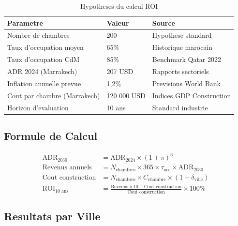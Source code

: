 \documentclass[12pt,a4paper]{report}
\begin{document}
\begin{itemize}[leftmargin=1.5em]
\begin{table}[H]
\centering\small\renewcommand{\arraystretch}{1.4}
\begin{tabular}{p{5cm}p{3cm}p{5cm}}
\toprule
\textbf{Parametre} & \textbf{Valeur} & \textbf{Source} \\
\midrule
Nombre de chambres & 200 & Hypothese standard \\
Taux d'occupation moyen & 65\% & Historique marocain \\
Taux d'occupation CdM & 85\% & Benchmark Qatar 2022 \\
ADR 2024 (Marrakech) & 207 USD & Rapports sectoriels \\
Inflation annuelle prevue & 1,2\% & Previsions World Bank \\
Cout par chambre (Marrakech) & 120 000 USD & Indices GDP Construction \\
Horizon d'evaluation & 10 ans & Standard industrie \\
\bottomrule
\end{tabular}
\caption{Hypotheses du calcul ROI}
\end{table}

\subsection{Formule de Calcul}

\begin{align*}
\text{ADR}_{2030}           &= \text{ADR}_{2024} \times (1 + \pi)^6 \\[0.5em]
\text{Revenus annuels}      &= N_{\text{chambres}} \times 365
  \times \tau_{\text{occ}} \times \text{ADR}_{2030} \\[0.5em]
\text{Cout construction}    &= N_{\text{chambres}} \times C_{\text{chambre}}
  \times (1 + \delta_{\text{ville}}) \\[0.5em]
\text{ROI}_{10\text{ ans}}  &= \frac{\text{Revenus} \times 10
  - \text{Cout construction}}{\text{Cout construction}} \times 100\%
\end{align*}

\subsection{Resultats par Ville}


\end{itemize}
\end{document}
